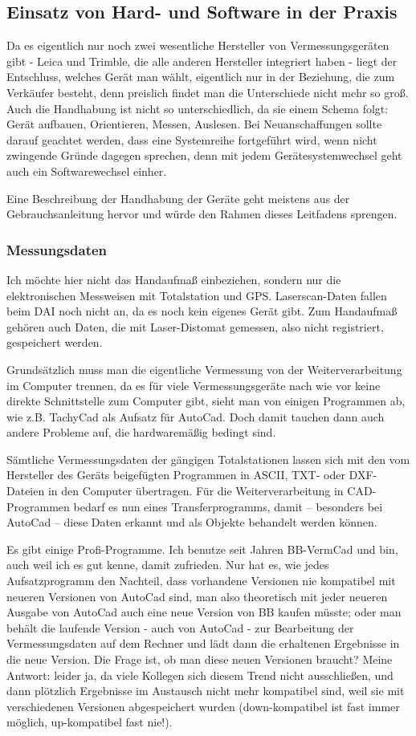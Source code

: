 \subsection*{Einsatz von Hard- und Software in der Praxis}
Da es eigentlich nur noch zwei wesentliche Hersteller von Vermessungsgeräten gibt - Leica und Trimble, die alle anderen Hersteller integriert haben - liegt der Entschluss, welches Gerät man wählt, eigentlich nur in der Beziehung, die zum Verkäufer besteht, denn preislich findet man die Unterschiede nicht mehr so groß. Auch die Handhabung ist nicht so unterschiedlich, da sie einem Schema folgt: Gerät aufbauen, Orientieren, Messen, Auslesen. Bei Neuanschaffungen sollte darauf geachtet werden, dass eine Systemreihe fortgeführt wird, wenn nicht zwingende Gründe dagegen sprechen, denn mit jedem Gerätesystemwechsel geht auch ein Softwarewechsel einher.

Eine Beschreibung der Handhabung der Geräte geht meistens aus der Gebrauchsanleitung hervor und würde den Rahmen dieses Leitfadens sprengen.

\subsubsection*{Messungsdaten}
Ich möchte hier nicht das Handaufmaß einbeziehen, sondern nur die elektronischen Messweisen mit Totalstation und GPS. Laserscan-Daten fallen beim DAI noch nicht an, da es noch kein eigenes Gerät gibt. Zum Handaufmaß gehören auch Daten, die mit Laser-Distomat gemessen, also nicht registriert, gespeichert werden.

Grundsätzlich muss man die eigentliche Vermessung von der Weiterverarbeitung im Computer trennen, da es für viele Vermessungsgeräte nach wie vor keine direkte Schnittstelle zum Computer gibt, sieht man von einigen Programmen ab, wie z.B. TachyCad als Aufsatz für AutoCad. Doch damit tauchen dann auch andere Probleme auf, die hardwaremäßig bedingt sind.

Sämtliche Vermessungsdaten der gängigen Totalstationen lassen sich mit den vom Hersteller des Geräts beigefügten Programmen in \gls{ASCII}, \gls{TXT}- oder \gls{DXF}-Dateien in den Computer übertragen. Für die Weiterverarbeitung in CAD-Programmen bedarf es nun eines Transferprogramms, damit -- besonders bei AutoCad -- diese Daten erkannt und als Objekte behandelt werden können.

Es gibt einige Profi-Programme. Ich benutze seit Jahren BB-VermCad und bin, auch weil ich es gut kenne, damit zufrieden. Nur hat es, wie jedes Aufsatzprogramm den Nachteil, dass vorhandene Versionen nie kompatibel mit neueren Versionen von AutoCad sind, man also theoretisch mit jeder neueren Ausgabe von AutoCad auch eine neue Version von BB kaufen müsste; oder man behält die laufende Version - auch von AutoCad - zur Bearbeitung der Vermessungsdaten auf dem Rechner und lädt dann die erhaltenen Ergebnisse in die neue Version. Die Frage ist, ob man diese neuen Versionen braucht? Meine Antwort: leider ja, da viele Kollegen sich diesem Trend nicht ausschließen, und dann plötzlich Ergebnisse im Austausch nicht mehr kompatibel sind, weil sie mit verschiedenen Versionen abgespeichert wurden (down-kompatibel ist fast immer möglich, up-kompatibel fast nie!).

